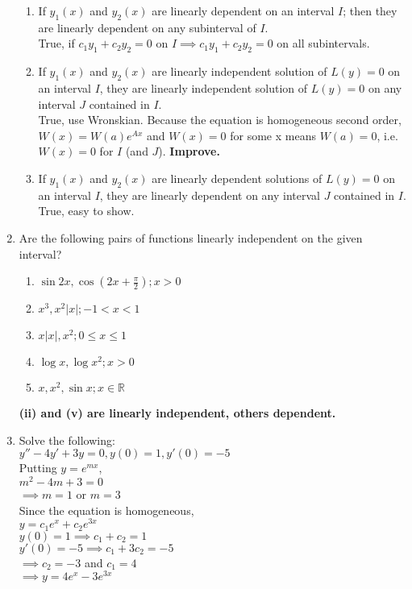 \documentclass[a4paper]{article}
\begin{document}
\begin{enumerate}
\begin{enumerate}
		\item If $y_1(x)$ and $y_2(x)$ are linearly dependent on an interval $I$; then they are linearly dependent on any subinterval of $I$.
		\\True, if $c_1y_1 +c_2y_2=0$ on $I \implies c_1y_1 +c_2y_2=0$ on all subintervals.
		
		\item If $y_1(x)$ and $y_2(x)$ are linearly independent solution of $L(y) = 0$ on an interval $I$, they are linearly independent solution of $L(y) = 0$ on any interval $J$ contained in $I$.
		\\True, use Wronskian. Because the equation is homogeneous second order, $W(x)=W(a)e^{Ax}$ and $W(x)=0$ for some x means $W(a)=0$, i.e. $W(x)=0$ for $I$ (and $J$). \textbf{Improve.}
		
		\item If $y_1(x)$ and $y_2(x)$ are linearly dependent solutions of $L(y) = 0$ on an interval $I$, they are linearly dependent on any interval $J$ contained in $I$.
		\\True, easy to show.
		
	\end{enumerate}
	
	
	\item Are the following pairs of functions linearly independent on the given interval?
	\begin{enumerate}
		\item $\sin 2x, \cos(2x+\frac{\pi}{2}); x>0$
		\item $x^3, x^2|x|; -1<x<1$
		\item $x|x|,x^2;0\leq x \leq 1$
		\item $\log x, \log x^2; x>0$
		\item $x,x^2,\sin x; x\in \mathds{R}$
	\end{enumerate}
	\textbf{(ii) and (v) are linearly independent, others dependent.}
	
	\item Solve the following:
	\\$y''-4y'+3y=0, y(0)=1, y'(0)=-5$\\
	Putting $y=e^{mx}$,\\
	$m^2-4m+3=0$\\
	$\implies m=1$ or $m=3$\\
	Since the equation is homogeneous,\\
	$y=c_1e^x+c_2e^{3x}$\\
	$y(0)=1 \implies c_1+c_2=1$\\
	$y'(0)=-5 \implies c_1 + 3c_2 =-5$\\
	$\implies c_2=-3$ and $c_1=4$\\
	$\implies y=4e^x-3e^{3x}$
	

\end{enumerate}
\end{document}

